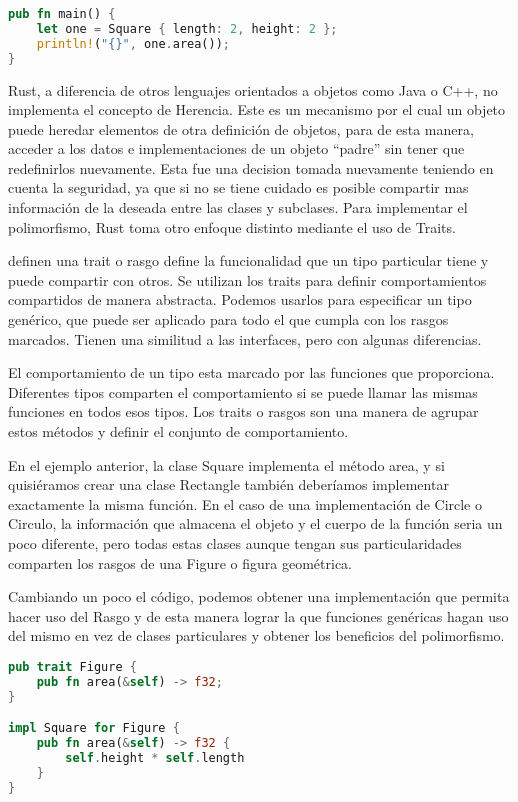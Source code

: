 \begin{lstlisting}[language=Rust]
pub fn main() {
    let one = Square { length: 2, height: 2 };
    println!("{}", one.area());
}
\end{lstlisting}

Rust, a diferencia de otros lenguajes orientados a objetos como Java o C++, no implementa el concepto de Herencia. Este es un mecanismo por el cual un objeto puede heredar elementos de otra definición de objetos, para de esta manera, acceder a los datos e implementaciones de un objeto ``padre'' sin tener que redefinirlos nuevamente.
Esta fue una decision tomada nuevamente teniendo en cuenta la seguridad, ya que si no se tiene cuidado es posible compartir mas información de la deseada entre las clases y subclases. Para implementar el polimorfismo, Rust toma otro enfoque distinto mediante el uso de Traits.

\cite{rustbook} definen una trait o rasgo define la funcionalidad que un tipo particular tiene y puede compartir con otros. Se utilizan los traits para definir comportamientos compartidos de manera abstracta. Podemos usarlos para especificar un tipo genérico, que puede ser aplicado para todo el que cumpla con los rasgos marcados. Tienen una similitud a las interfaces, pero con algunas diferencias.

El comportamiento de un tipo esta marcado por las funciones que proporciona. Diferentes tipos comparten el comportamiento si se puede llamar las mismas funciones en todos esos tipos. Los traits o rasgos son una manera de agrupar estos métodos y definir el conjunto de comportamiento.

En el ejemplo anterior, la clase Square implementa el método area, y si quisiéramos crear una clase Rectangle también deberíamos implementar exactamente la misma función. En el caso de una implementación de Circle o Circulo, la información que almacena el objeto y el cuerpo de la función \textit{} seria un poco diferente, pero todas estas clases aunque tengan sus particularidades comparten los rasgos de una Figure o figura geométrica.

Cambiando un poco el código, podemos obtener una implementación que permita hacer uso del Rasgo y de esta manera lograr la que funciones genéricas hagan uso del mismo en vez de clases particulares y obtener los beneficios del polimorfismo.

\begin{lstlisting}[language=Rust]
pub trait Figure {
    pub fn area(&self) -> f32;
}

impl Square for Figure {
    pub fn area(&self) -> f32 {
        self.height * self.length
    }
}
\end{lstlisting}


